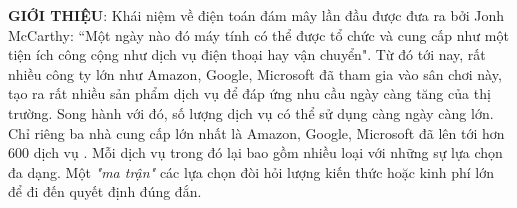 \documentclass{article}
\begin{document}
\textbf{GIỚI THIỆU}: Khái niệm về điện toán đám mây lần đầu được đưa ra bởi Jonh McCarthy: “Một ngày nào đó máy tính có thể được tổ chức và cung cấp như một tiện ích công cộng như dịch vụ điện thoại hay vận chuyển"\cite{garfinkel1999architects}. Từ đó tới nay, rất nhiều công ty lớn như Amazon, Google, Microsoft đã tham gia vào sân chơi này, tạo ra rất nhiều sản phẩm dịch vụ để đáp ứng nhu cầu ngày càng tăng của thị trường. Song hành với đó, số lượng dịch vụ có thể sử dụng càng ngày càng lớn. Chỉ riêng ba nhà cung cấp lớn nhất là Amazon, Google, Microsoft đã lên tới hơn 600 dịch vụ . Mỗi dịch vụ trong đó lại bao gồm nhiều loại với những sự lựa chọn đa dạng. Một \textit{"ma trận"} các lựa chọn đòi hỏi lượng kiến thức hoặc kinh phí lớn để đi đến quyết định đúng đắn.\\
\end{document}
